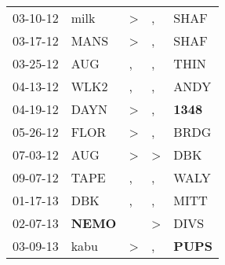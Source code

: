 \begin{supertabular}{p{0.07\textwidth}p{0.06\textwidth}p{0.02\textwidth}p{0.02\textwidth}p{0.06\textwidth}}
 03-10-12\textsuperscript{} &           milk\textsuperscript{} &  \textgreater &             , &           SHAF\textsuperscript{} \\
 03-17-12\textsuperscript{} &           MANS\textsuperscript{} &  \textgreater &             , &           SHAF\textsuperscript{} \\
 03-25-12\textsuperscript{} &            AUG\textsuperscript{} &             , &             , &           THIN\textsuperscript{} \\
 04-13-12\textsuperscript{} &           WLK2\textsuperscript{} &             , &             , &           ANDY\textsuperscript{} \\
 04-19-12\textsuperscript{} &           DAYN\textsuperscript{} &  \textgreater &             , &  \textbf{1348\textsuperscript{}} \\
 05-26-12\textsuperscript{} &           FLOR\textsuperscript{} &  \textgreater &             , &           BRDG\textsuperscript{} \\
 07-03-12\textsuperscript{} &            AUG\textsuperscript{} &  \textgreater &  \textgreater &            DBK\textsuperscript{} \\
 09-07-12\textsuperscript{} &           TAPE\textsuperscript{} &             , &             , &           WALY\textsuperscript{} \\
 01-17-13\textsuperscript{} &            DBK\textsuperscript{} &             , &             , &           MITT\textsuperscript{} \\
 02-07-13\textsuperscript{} &  \textbf{NEMO\textsuperscript{}} &               &  \textgreater &           DIVS\textsuperscript{} \\
 03-09-13\textsuperscript{} &           kabu\textsuperscript{} &  \textgreater &             , &  \textbf{PUPS\textsuperscript{}} \\
\end{supertabular}
